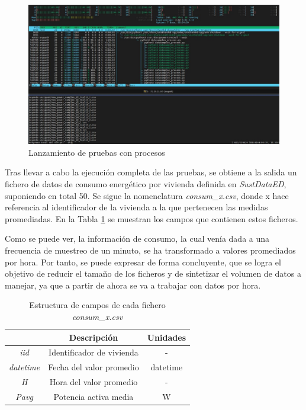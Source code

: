 \begin{figure}[h!]
  \centering
  \includegraphics[width=1\textwidth]{img/diseno/multiprocess.jpg}
  \caption{Lanzamiento de pruebas con procesos}
  \label{fig:multiprocess}
\end{figure}

\vspace{3mm}

Tras llevar a cabo la ejecución completa de las pruebas, se obtiene a la salida un fichero de datos de consumo energético por vivienda definida en \textit{SustDataED}, suponiendo en total 50. Se sigue la nomenclatura \textit{consum\_x.csv}, donde x hace referencia al identificador de la vivienda a la que pertenecen las medidas promediadas. En la Tabla \ref{tab:consum} se muestran los campos que contienen estos ficheros.

\vspace{3mm}

Como se puede ver, la información de consumo, la cual venía dada a una frecuencia de muestreo de un minuto, se ha transformado a valores promediados por hora. Por tanto, se puede expresar de forma concluyente, que se logra el objetivo de reducir el tamaño de los ficheros y de sintetizar el volumen de datos a manejar, ya que a partir de ahora se va a trabajar con datos por hora.

\vspace{3mm}

\begin{table}[h!]
  \centering
  \begin{tabular}{|c|c|c|}
  \hline
  \rowcolor[HTML]{AAAAAA} 
  \multicolumn{1}{|c|}{\cellcolor[HTML]{AAAAAA}Campo} & \multicolumn{1}{c|}{\cellcolor[HTML]{AAAAAA}Descripción} & Unidades \\ \hline
  \textit{iid} & Identificador de vivienda & - \\ \hline
  \textit{datetime} & Fecha del valor promedio & datetime \\ \hline
  \textit{H} & Hora del valor promedio & - \\ \hline
  \textit{Pavg} & Potencia activa media & W \\ \hline
  \end{tabular}
  \caption{Estructura de campos de cada fichero \textit{consum\_x.csv}}
  \label{tab:consum}
\end{table}

